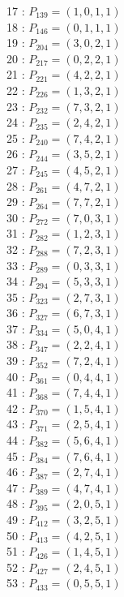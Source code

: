 \documentclass{article}
\begin{document}
{\begin{multicols}{3}
17 : $P_{139}=( 1, 0, 1, 1 )$\\
18 : $P_{146}=( 0, 1, 1, 1 )$\\
19 : $P_{204}=( 3, 0, 2, 1 )$\\
20 : $P_{217}=( 0, 2, 2, 1 )$\\
21 : $P_{221}=( 4, 2, 2, 1 )$\\
22 : $P_{226}=( 1, 3, 2, 1 )$\\
23 : $P_{232}=( 7, 3, 2, 1 )$\\
24 : $P_{235}=( 2, 4, 2, 1 )$\\
25 : $P_{240}=( 7, 4, 2, 1 )$\\
26 : $P_{244}=( 3, 5, 2, 1 )$\\
27 : $P_{245}=( 4, 5, 2, 1 )$\\
28 : $P_{261}=( 4, 7, 2, 1 )$\\
29 : $P_{264}=( 7, 7, 2, 1 )$\\
30 : $P_{272}=( 7, 0, 3, 1 )$\\
31 : $P_{282}=( 1, 2, 3, 1 )$\\
32 : $P_{288}=( 7, 2, 3, 1 )$\\
33 : $P_{289}=( 0, 3, 3, 1 )$\\
34 : $P_{294}=( 5, 3, 3, 1 )$\\
35 : $P_{323}=( 2, 7, 3, 1 )$\\
36 : $P_{327}=( 6, 7, 3, 1 )$\\
37 : $P_{334}=( 5, 0, 4, 1 )$\\
38 : $P_{347}=( 2, 2, 4, 1 )$\\
39 : $P_{352}=( 7, 2, 4, 1 )$\\
40 : $P_{361}=( 0, 4, 4, 1 )$\\
41 : $P_{368}=( 7, 4, 4, 1 )$\\
42 : $P_{370}=( 1, 5, 4, 1 )$\\
43 : $P_{371}=( 2, 5, 4, 1 )$\\
44 : $P_{382}=( 5, 6, 4, 1 )$\\
45 : $P_{384}=( 7, 6, 4, 1 )$\\
46 : $P_{387}=( 2, 7, 4, 1 )$\\
47 : $P_{389}=( 4, 7, 4, 1 )$\\
48 : $P_{395}=( 2, 0, 5, 1 )$\\
49 : $P_{412}=( 3, 2, 5, 1 )$\\
50 : $P_{413}=( 4, 2, 5, 1 )$\\
51 : $P_{426}=( 1, 4, 5, 1 )$\\
52 : $P_{427}=( 2, 4, 5, 1 )$\\
53 : $P_{433}=( 0, 5, 5, 1 )$\\

\end{multicols}}
\end{document}
